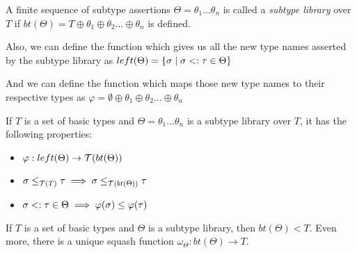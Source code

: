 \documentclass[main.tex]{subfiles}
\begin{document}
\begin{defn}
    A finite sequence of subtype assertions
    $\Theta = \theta_1 ... \theta_n$ is called a \emph{subtype library} over $T$
    if $bt(\Theta) = T \oplus \theta_1 \oplus \theta_2 ... \oplus \theta_n$ is defined.

    Also, we can define the function which gives us all the new type names
    asserted by the subtype library as
    $left(\Theta) = \{ \sigma \mid \sigma <: \tau \in \Theta \}$

    And we can define the function which maps those new type names to their
    respective types as
    $\varphi = \emptyset \oplus \theta_1 \oplus \theta_2 ... \oplus \theta_n$
\end{defn}

\begin{prop}
    If $T$ is a set of basic types and
    $\Theta = \theta_1 ... \theta_n$ is a subtype library over $T$, it has the
    following properties:
    \begin{itemize}
        \item $\varphi : left(\Theta) \rightarrow \mathcal{T}( bt(\Theta) )$
        \item $\sigma \leq_{\mathcal{T}( T )} \tau \implies \sigma \leq_{\mathcal{T}( bt(\Theta) )} \tau$
        \item $\sigma <: \tau \in \Theta \implies \varphi(\sigma) \leq \varphi(\tau)$
    \end{itemize}
\end{prop}

\begin{prop}
    If $T$ is a set of basic types and $\Theta$ is a subtype library, then
    $bt(\Theta) \less T$. Even more, there is a unique squash function
    $\omega_{\Theta} : bt(\Theta) \rightarrow T$.
\end{prop}
\end{document}
